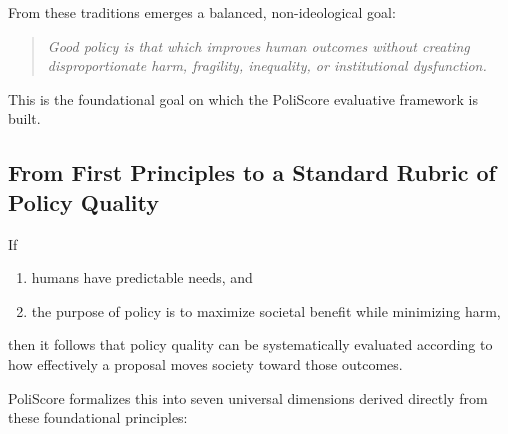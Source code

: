 \documentclass[12pt]{article}
\begin{document}
From these traditions emerges a balanced, non-ideological goal:

\begin{quote}
\textit{Good policy is that which improves human outcomes without creating disproportionate harm, fragility, inequality,
or institutional dysfunction.}
\end{quote}

This is the foundational goal on which the PoliScore evaluative framework is built.

\subsection{From First Principles to a Standard Rubric of Policy Quality}

If
\begin{enumerate}[label=(\alph*)]
    \item humans have predictable needs, and
    \item the purpose of policy is to maximize societal benefit while minimizing harm,
\end{enumerate}
then it follows that policy quality can be systematically evaluated according to how effectively a proposal moves society
toward those outcomes.

PoliScore formalizes this into seven universal dimensions derived directly from these foundational principles:
\end{document}
